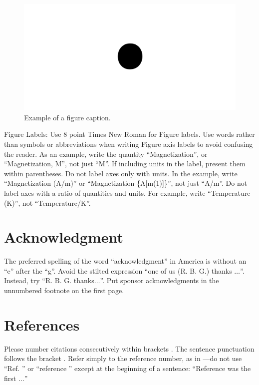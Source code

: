 \documentclass[conference]{IEEEtran}
\begin{document}
	\begin{figure}[htbp]
		\centerline{\includegraphics{figures/fig1.png}}
		\caption{Example of a figure caption.}
		\label{fig}
	\end{figure}
	
	Figure Labels: Use 8 point Times New Roman for Figure labels. Use words 
	rather than symbols or abbreviations when writing Figure axis labels to 
	avoid confusing the reader. As an example, write the quantity 
	``Magnetization'', or ``Magnetization, M'', not just ``M''. If including 
	units in the label, present them within parentheses. Do not label axes only 
	with units. In the example, write ``Magnetization (A/m)'' or ``Magnetization 
	\{A[m(1)]\}'', not just ``A/m''. Do not label axes with a ratio of 
	quantities and units. For example, write ``Temperature (K)'', not 
	``Temperature/K''.
	
	\section*{Acknowledgment}
	
	The preferred spelling of the word ``acknowledgment'' in America is without 
	an ``e'' after the ``g''. Avoid the stilted expression ``one of us (R. B. 
	G.) thanks $\ldots$''. Instead, try ``R. B. G. thanks$\ldots$''. Put sponsor 
	acknowledgments in the unnumbered footnote on the first page.
	
	\section*{References}
	
	Please number citations consecutively within brackets \cite{b1}. The 
	sentence punctuation follows the bracket \cite{b2}. Refer simply to the reference 
	number, as in \cite{b3}---do not use ``Ref. \cite{b3}'' or ``reference \cite{b3}'' except at 
	the beginning of a sentence: ``Reference \cite{b3} was the first $\ldots$''
	
\end{document}
